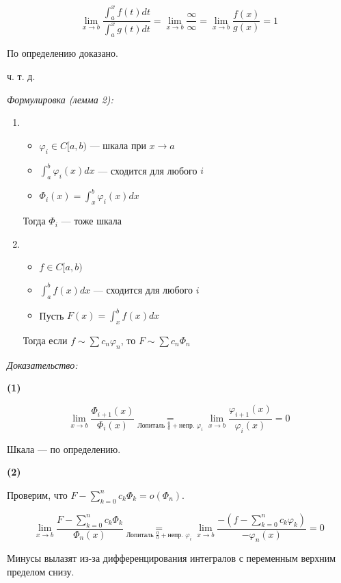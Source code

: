 \documentclass{article}
\def\eqby#1{\underset{#1}{=}}
\begin{document}
\[\lim_{x \rightarrow b} \frac{\int_a^x f(t) dt}{\int_a^x g(t) dt} = \lim_{x \rightarrow b} \frac{\infty}{\infty} = \lim_{x \rightarrow b}\frac{f(x)}{g(x)} = 1\]

По определению доказано.

ч. т. д. 

\textit{Формулировка (лемма 2):}

\begin{enumerate}
    \item 
        \begin{itemize}
            \item $\varphi_i \in C[a, b)$ --- шкала при $x \rightarrow a$
            \item $\int_a^b \varphi_i(x) dx$ --- сходится для любого $i$
            \item $\Phi_i(x) = \int_x^b \varphi_i(x) dx$
        \end{itemize}

        Тогда $\Phi_i$ --- тоже шкала

    \item     
        \begin{itemize}
            \item $f\in C[a, b)$
            \item $\int_a^b f(x) dx$ --- сходится для любого $i$
            \item Пусть $F(x) = \int_x^b f(x) dx$
        \end{itemize}

        Тогда если $f \sim \sum c_n \varphi_n$, то $F \sim \sum c_n \Phi_n$
\end{enumerate}

\textit{Доказательство:}

\textbf{(1)}

\[\lim_{x \rightarrow b}\frac{\Phi_{i + 1}(x)}{\Phi_{i}(x)} \eqby{\text{Лопиталь } \frac{0}{0} + \text{непр. }\varphi_i} \lim_{x \rightarrow b}\frac{\varphi_{i + 1}(x)}{\varphi_{i}(x)} = 0\]

Шкала --- по определению.

\textbf{(2)}

Проверим, что $F - \sum_{k = 0}^{n} c_k \Phi_{k} = o(\Phi_n)$.

\[\lim_{x \rightarrow b}\frac{F - \sum_{k = 0}^{n} c_{k} \Phi_{k}}{\Phi_{n}(x)} \eqby{\text{Лопиталь } \frac{0}{0} + \text{непр. }\varphi_i} \lim_{x \rightarrow b}\frac{-(f - \sum_{k = 0}^{n} c_{k} \varphi_{k})}{-\varphi_{n}(x)} = 0\]

Минусы вылазят из-за дифференцирования интегралов с переменным верхним пределом снизу.
\end{document}
